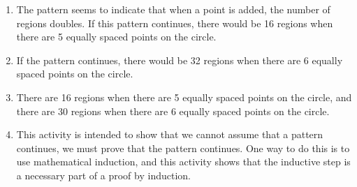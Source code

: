 \begin{enumerate}
\begin{enumerate}
\item The pattern seems to indicate that when a point is added, the number of regions doubles.  If this pattern continues, there would be 16 regions when there are 5 equally spaced points on the circle.

\item If the pattern continues, there would be 32 regions when there are 6 equally spaced points on the circle.

\item There are 16 regions when there are 5 equally spaced points on the circle, and there are 30 
regions when there are 6 equally spaced points on the circle.

\item This activity is intended to show that we cannot assume that a pattern continues, we must prove that the pattern continues.  One way to do this is to use mathematical induction, and this activity shows that the inductive step is a necessary part of a proof by induction.

\end{enumerate}

\end{enumerate}



\hbreak
\endinput


\left( -1 \right)^{n-1} \dfrac{ \left( n - 1 \right)!}{x^n}$


\item For the inductive step, the following trigonometric identities are useful:
\begin{list}{}
\item $\cos \left( \alpha + \beta \right) = \cos \alpha \cos \beta - \sin \alpha \sin \beta$.
\item $\sin \left( \alpha + \beta \right) = \sin \alpha \cos \beta + \cos \alpha \sin \beta$.

\end{list}
If $\left[ {\cos x + i(\sin x)} \right]^k  = \cos (kx) + i\left( {\sin (kx)} \right)$, then
\[
\begin{aligned}
\left[ {\cos x + i(\sin x)} \right]^{k+1} &= \left[ {\cos x + i(\sin x)} \right]^k \left[ {\cos x + i \left(\sin x \right)} \right] \\
  &= \left( \cos (kx) + i {\sin (kx)} \right) \left( \cos x + i \left(\sin x \right) \right) \\
  &= \left( \cos \left( kx \right) \cos x - \sin \left( kx \right) sin x \right) + 
      i \left( \sin \left( kx \right) cos x + \cos \left( kx \right) \sin x \right)\\
  &= \cos \left(kx + x \right) + i \sin \left( kx + x \right) \\
  &= \cos \left( \left( k + 1 \right ) x \right) + i \sin \left( \left( k + 1 \right ) x \right).\\ 
\end{aligned}
\]


